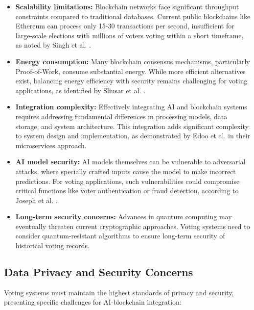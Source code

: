 \documentclass[conference]{IEEEtran}
\begin{document}
\begin{itemize}
    \item \textbf{Scalability limitations:} Blockchain networks face significant throughput constraints compared to traditional databases. Current public blockchains like Ethereum can process only 15-30 transactions per second, insufficient for large-scale elections with millions of voters voting within a short timeframe, as noted by Singh et al. \cite{b5}.
    
    \item \textbf{Energy consumption:} Many blockchain consensus mechanisms, particularly Proof-of-Work, consume substantial energy. While more efficient alternatives exist, balancing energy efficiency with security remains challenging for voting applications, as identified by Sliusar et al. \cite{b4}.
    
    \item \textbf{Integration complexity:} Effectively integrating AI and blockchain systems requires addressing fundamental differences in processing models, data storage, and system architecture. This integration adds significant complexity to system design and implementation, as demonstrated by Edoo et al. \cite{b7} in their microservices approach.
    
    \item \textbf{AI model security:} AI models themselves can be vulnerable to adversarial attacks, where specially crafted inputs cause the model to make incorrect predictions. For voting applications, such vulnerabilities could compromise critical functions like voter authentication or fraud detection, according to Joseph et al. \cite{b6}.
    
    \item \textbf{Long-term security concerns:} Advances in quantum computing may eventually threaten current cryptographic approaches. Voting systems need to consider quantum-resistant algorithms to ensure long-term security of historical voting records.
\end{itemize}

\subsection{Data Privacy and Security Concerns}
Voting systems must maintain the highest standards of privacy and security, presenting specific challenges for AI-blockchain integration:
\end{document}
